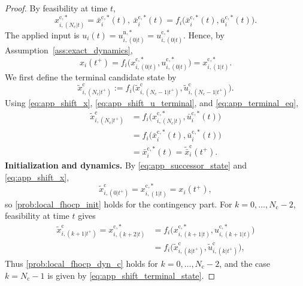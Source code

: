 \documentclass[twocolumn]{autart}
\begin{document}
\begin{proof}
By feasibility at time $t$,
\begin{equation}
x_{i,(N_{\mathrm c}|t)}^{\mathrm c,\ast}
=
\bar x_i^{\mathrm c,\ast}(t),
\
\bar x_i^{\mathrm c,\ast}(t)
=
f_i\!\bigl(\bar x_i^{\mathrm c,\ast}(t),\bar u_i^{\mathrm c,\ast}(t)\bigr).
\label{eq:app_terminal_eq}
\end{equation}
The applied input is
\(
u_i(t)=u_{i,(0|t)}^{\mathrm n,\ast}=u_{i,(0|t)}^{\mathrm c,\ast}.
\)
Hence, by Assumption~\ref{ass:exact_dynamics},
\begin{equation}
x_i(t^+)
=
f_i\!\bigl(x_{i,(0|t)}^{\mathrm c,\ast},u_{i,(0|t)}^{\mathrm c,\ast}\bigr)
=
x_{i,(1|t)}^{\mathrm c,\ast}.
\label{eq:app_successor_state}
\end{equation}
We first define the terminal candidate state by
\begin{equation}
\tilde x_{i,(N_{\mathrm c}|t^+)}^{\mathrm c}
:=
f_i\!\bigl(
\tilde x_{i,(N_{\mathrm c}-1|t^+)}^{\mathrm c},
\tilde u_{i,(N_{\mathrm c}-1|t^+)}^{\mathrm c}
\bigr).
\label{eq:app_shift_terminal_state}
\end{equation}
Using \eqref{eq:app_shift_x}, \eqref{eq:app_shift_u_terminal}, and \eqref{eq:app_terminal_eq},
\begin{equation}
\begin{aligned}
\tilde x_{i,(N_{\mathrm c}|t^+)}^{\mathrm c}
&=
f_i\bigl(x_{i,(N_{\mathrm c}|t)}^{\mathrm c,\ast},\bar u_i^{\mathrm c,\ast}(t)\bigr)\\
&=
f_i\bigl(\bar x_i^{\mathrm c,\ast}(t),\bar u_i^{\mathrm c,\ast}(t)\bigr)\\
&=
\bar x_i^{\mathrm c,\ast}(t)
=
\tilde{\bar x}_i^{\mathrm c}(t^+).
\label{eq:app_terminal_state_equals_bar}
\end{aligned}
\end{equation}
\smallskip
\noindent\textbf{Initialization and dynamics.}
By \eqref{eq:app_successor_state} and \eqref{eq:app_shift_x},
\[
\tilde x_{i,(0|t^+)}^{\mathrm c}
=
x_{i,(1|t)}^{\mathrm c,\ast}
=
x_i(t^+),
\]
so \eqref{prob:local_fhocp_init} holds for the contingency part.
For $k=0,\dots,N_{\mathrm c}-2$, feasibility at time $t$ gives
\begin{align*}
\tilde x_{i,(k+1|t^+)}^{\mathrm c}
=
x_{i,(k+2|t)}^{\mathrm c,\ast}
&=
f_i\!\bigl(x_{i,(k+1|t)}^{\mathrm c,\ast},u_{i,(k+1|t)}^{\mathrm c,\ast}\bigr)
\\
&=
f_i\!\bigl(\tilde x_{i,(k|t^+)}^{\mathrm c},\tilde u_{i,(k|t^+)}^{\mathrm c}\bigr),
\end{align*}
Thus \eqref{prob:local_fhocp_dyn_c} holds for $k=0,\dots,N_{\mathrm c}-2$, and the case $k=N_{\mathrm c}-1$ is given by \eqref{eq:app_shift_terminal_state}.


\end{proof}
\end{document}

